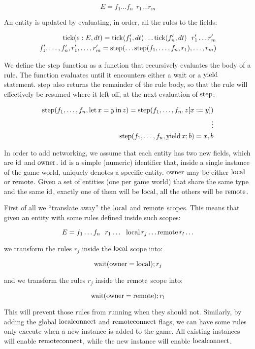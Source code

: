 $$E = { f_1 \dots f_n \ \ r_1 \dots r_m }$$

An entity is updated by evaluating, in order, all the rules to the fields:

\begin{align*}
\operatorname{tick}(e:E, dt) = { \operatorname{tick}(f_1',dt) \dots \operatorname{tick}(f_n',dt) \ \ r_1' \dots r_m' }\\
f_1',\dots,f_n',r_1',\dots,r_m' = \operatorname{step}(\dots \operatorname{step}(f_1,\dots,f_n,r_1), \dots, r_m)
\end{align*}

We define the $\operatorname{step}$ function as a function that recursively evaluates the body of a rule. The function evaluates until it encounters either a $\operatorname{wait}$ or a $\operatorname{yield}$ statement. $\operatorname{step}$ also returns the remainder of the rule body, so that the rule will effectively be resumed where it left off, at the next evaluation of $\operatorname{step}$:

\begin{align*}
\operatorname{step}(f_1, \dots, f_n, \operatorname{let} x = y \operatorname{in} z) = \operatorname{step}(f_1, \dots, f_n, z[x:=y]) \\
\vdots \\
\operatorname{step}(f_1, \dots, f_n, \operatorname{yield} x; b) = x, b
\end{align*}

In order to add networking, we assume that each entity has two new fields, which are $\operatorname{id}$ and $\operatorname{owner}$. $\operatorname{id}$ is a simple (numeric) identifier that, inside a single instance of the game world, uniquely denotes a specific entity. $\operatorname{owner}$ may be either $\operatorname{local}$ or $\operatorname{remote}$. Given a set of entities (one per game world) that share the same type and the same $\operatorname{id}$, exactly one of them will be $\operatorname{local}$, all the others will be $\operatorname{remote}$.

First of all we ``translate away'' the $\operatorname{local}$ and $\operatorname{remote}$ scopes. This means that given an entity with some rules defined inside such scopes:

$$E = { f_1 \dots f_n \ \ r_1 \dots \ \ \local{ r_j \dots } \remote{ r_l \dots } }$$

we transform the rules $r_j$ inside the $\operatorname{local}$ scope into:

$$\operatorname{wait}(\operatorname{owner} = \operatorname{local}); r_j$$

and we transform the rules $r_j$ inside the $\operatorname{remote}$ scope into:

$$\operatorname{wait}(\operatorname{owner} = \operatorname{remote}); r_l$$

This will prevent those rules from running when they should not. Similarly, by adding the global $\operatorname{localconnect}$ and $\operatorname{remoteconnect}$ flags, we can have some rules only execute when a new instance is added to the game. All existing instances will enable $\operatorname{remoteconnect}$, while the new instance will enable $\operatorname{localconnect}$.

